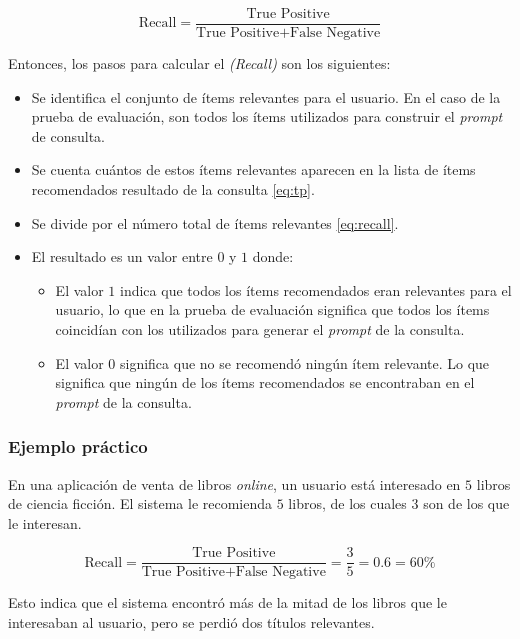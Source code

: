 \documentclass[11pt,a4paper,twoside]{thesis}
\begin{document}
\begin{equation}
	\text{Recall} = \frac{\text{True Positive}}{\text{True Positive} + \text{False Negative}}
	\label{eq:recall}
\end{equation}

Entonces, los pasos para calcular el \textit{(Recall)} son los siguientes:

\begin{itemize}
	\item Se identifica el conjunto de ítems relevantes para el usuario. En el caso de la prueba de evaluación, son todos los ítems utilizados para construir el \textit{prompt} de consulta.
	\item Se cuenta cuántos de estos ítems relevantes aparecen en la lista de ítems recomendados resultado de la consulta \ref{eq:tp}.
	\item Se divide por el número total de ítems relevantes \ref{eq:recall}.
	\item El resultado es un valor entre $0$ y $1$ donde:
	      \begin{itemize}
		      \item El valor $1$ indica que todos los ítems recomendados eran relevantes para el usuario, lo que en la prueba de evaluación significa que todos los ítems coincidían con los utilizados para generar el \textit{prompt} de la consulta.
		      \item El valor $0$ significa que no se recomendó ningún ítem relevante. Lo que significa que ningún de los ítems recomendados se encontraban en el \textit{prompt} de la consulta.
	      \end{itemize}
\end{itemize}

\subsubsection{Ejemplo práctico}
En una aplicación de venta de libros \textit{online}, un usuario está interesado en $5$ libros de ciencia ficción. El sistema le recomienda $5$ libros, de los cuales $3$ son de los que le interesan.

\begin{equation}
	\text{Recall} = \frac{\text{True Positive}}{\text{True Positive} + \text{False Negative}} = \frac{3}{5} = 0.6 = 60\%
\end{equation}

Esto indica que el sistema encontró más de la mitad de los libros que le interesaban al usuario, pero se perdió dos títulos relevantes.
\end{document}
